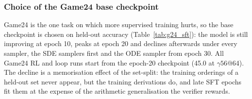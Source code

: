 \begin{table}[H]
\centering\small\color{blue}
\caption{\textcolor{blue}{Test accuracy (\%) and total training compute (PFLOPs). The GRR 64-sampler row is newly evaluated; all other accuracies are from Table~\ref{tab:main}. Critic-stage costs are included in the SVG totals. Compute is measured relative to the task-SFT base.}}
\label{tab:matched_compute}
\setlength{\tabcolsep}{3pt}
\end{table}
\endgroup

\iffalse
\subsubsection{Choice of the Game24 base checkpoint}
\label{app:g24_sft}
Game24 is the one task on which more supervised training hurts, so the base checkpoint is chosen on held-out accuracy (Table~\ref{tab:g24_sft}): the model is still improving at epoch 10, peaks at epoch 20 and declines afterwards under every sampler, the SDE samplers first and the ODE sampler from epoch 30. All Game24 RL and loop runs start from the epoch-20 checkpoint (45.0 at $\gamma56$@64). The decline is a memorisation effect of the set-split: the training orderings of a held-out set never appear, but the training derivations do, and late SFT epochs fit them at the expense of the arithmetic generalisation the verifier rewards.

